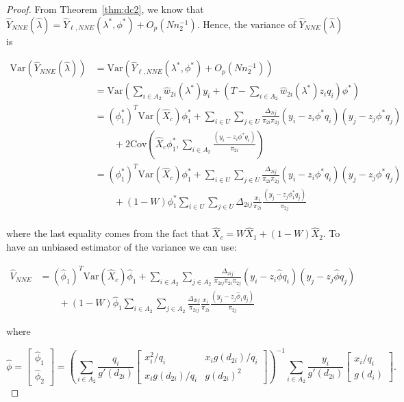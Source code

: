 \documentclass[12pt]{article}
\newcommand{\Cov}{{\text{Cov}}}
\newcommand{\Var}{{\text{Var}}}
\begin{document}
\begin{proof}
  From Theorem~\ref{thm:dc2}, we know that $\hat Y_{NNE}(\hat \lambda) = 
  \hat Y_{\ell, NNE}(\lambda^*, \phi^*) + O_p(Nn_2^{-1})$. Hence, the variance
  of $\hat Y_{NNE}(\hat \lambda)$ is 

  \begin{align*}
    \Var(\hat Y_{NNE}(\hat \lambda)) 
    &= \Var(\hat Y_{\ell, NNE}(\lambda^*, \phi^*) + O_p(Nn_2^{-1})) \\ 
    &= \Var\left(\sum_{i \in A_2} \hat w_{2i}(\lambda^*) y_i + \left(T - \sum_{i
    \in A_2} \hat w_{2i}(\lambda^*) z_i q_i\right)\phi^*\right)\\
    &= (\phi_1^*)^T \Var(\hat X_c) \phi_1^* + 
    \sum_{i \in U} \sum_{j \in U} \frac{\Delta_{2ij}}{\pi_{2i}\pi_{2j}} (y_i - z_i \phi^* q_i)(y_j - z_j \phi^* q_j)\\
    &\qquad+ 2 \Cov\left(\hat X_c \phi_1^*, \sum_{i \in A_2} \frac{(y_i - z_i \phi^*
    q_i)}{\pi_{2i}}\right) \\
    &= (\phi_1^*)^T \Var(\hat X_c) \phi_1^* + 
    \sum_{i \in U} \sum_{j \in U} \frac{\Delta_{2ij}}{\pi_{2i}\pi_{2j}} (y_i - z_i \phi^* q_i)(y_j - z_j \phi^* q_j)\\
    &\qquad + (1 - W)\phi_1^* \sum_{i \in U} \sum_{j \in U} \Delta_{2ij} \frac{x_i}{\pi_{2i}}
    \frac{(y_j - z_j \phi^*_1 q_j)}{\pi_{2j}}\\
  \end{align*}

  where the last equality comes from the fact that $\hat X_c = W\hat X_1 + (1 -
  W) \hat X_2$. To have an unbiased estimator of the variance we can use:

  \begin{align*}
    \hat V_{NNE} 
    &= (\hat \phi_1)^T \Var(\hat X_c) \hat \phi_1 + 
    \sum_{i \in A_2} \sum_{j \in A_2} \frac{\Delta_{2ij}}{\pi_{2ij}\pi_{2i}\pi_{2j}} 
    (y_i - z_i \hat \phi q_i)(y_j - z_j \hat \phi q_j) \\
    &\qquad + (1 - W)\hat \phi_1 \sum_{i \in A_2} \sum_{j \in A_2} \frac{\Delta_{2ij}}{\pi_{2ij}}
    \frac{x_i}{\pi_{2i}} \frac{(y_j - z_j \hat \phi_1 q_j)}{\pi_{2j}}
  \end{align*}

  where 
  
  $$\hat \phi =
  \begin{bmatrix}
    \hat \phi_1 \\ \hat \phi_2
  \end{bmatrix} = 
  \left(\sum_{i \in A_2} \frac{q_i}{g'(d_{2i})} 
  \begin{bmatrix}
    x_i^2 / q_i & x_i g(d_{2i}) / q_i \\
    x_i g(d_{2i}) / q_i & g(d_{2i})^2
  \end{bmatrix}
  \right)^{-1}
  \sum_{i \in A_2} \frac{y_i}{g'(d_{2i})} 
  \begin{bmatrix} x_i / q_i \\ g(d_i) \end{bmatrix}.
  $$

\end{proof}
\end{document}
